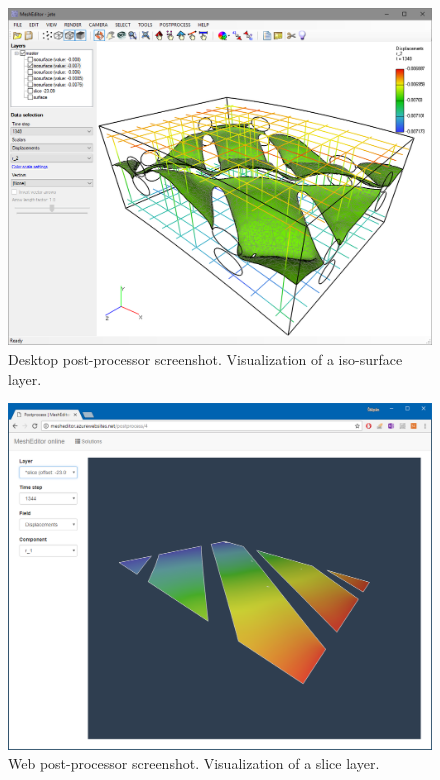 \begin{figure}[H]
    \centering
    \includegraphics[width=\textwidth]{figures/chapter-data-management/desktop-postprocessor-isosurface}
    \decoRule
    \caption{Desktop post-processor screenshot. Visualization of a iso-surface layer.}
    \label{fig:desktop-postprocessor-isosurface}
\end{figure}

\begin{figure}[H]
    \centering
    \includegraphics[width=\textwidth]{figures/chapter-data-management/web-postprocessor-slice}
    \decoRule
    \caption{Web post-processor screenshot. Visualization of a slice layer.}
    \label{fig:web-postprocessor-slice}
\end{figure}

